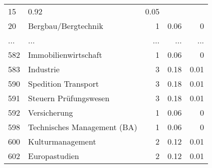 \begin{longtable}{lXrrr}
          \num{15} &
          \num[round-mode=places,round-precision=2]{0.92} &
          \num[round-mode=places,round-precision=2]{0.05} \\
        20 & \multicolumn{1}{X}{Bergbau/Bergtechnik} & %
          \num{1} &
          \num[round-mode=places,round-precision=2]{0.06} &
          \num[round-mode=places,round-precision=2]{0} \\
       ... & ... & ... & ... & ... \\
        582 & \multicolumn{1}{X}{Immobilienwirtschaft} & %
          \num{1} &
          \num[round-mode=places,round-precision=2]{0.06} &
          \num[round-mode=places,round-precision=2]{0} \\

        583 & \multicolumn{1}{X}{Industrie} & %
          \num{3} &
          \num[round-mode=places,round-precision=2]{0.18} &
          \num[round-mode=places,round-precision=2]{0.01} \\

        590 & \multicolumn{1}{X}{Spedition Transport} & %
          \num{3} &
          \num[round-mode=places,round-precision=2]{0.18} &
          \num[round-mode=places,round-precision=2]{0.01} \\

        591 & \multicolumn{1}{X}{Steuern Prüfungswesen} & %
          \num{3} &
          \num[round-mode=places,round-precision=2]{0.18} &
          \num[round-mode=places,round-precision=2]{0.01} \\

        592 & \multicolumn{1}{X}{Versicherung} & %
          \num{1} &
          \num[round-mode=places,round-precision=2]{0.06} &
          \num[round-mode=places,round-precision=2]{0} \\

        598 & \multicolumn{1}{X}{Technisches Management (BA)} & %
          \num{1} &
          \num[round-mode=places,round-precision=2]{0.06} &
          \num[round-mode=places,round-precision=2]{0} \\

        600 & \multicolumn{1}{X}{Kulturmanagement} & %
          \num{2} &
          \num[round-mode=places,round-precision=2]{0.12} &
          \num[round-mode=places,round-precision=2]{0.01} \\

        602 & \multicolumn{1}{X}{Europastudien} & %
          \num{2} &
          \num[round-mode=places,round-precision=2]{0.12} &
          \num[round-mode=places,round-precision=2]{0.01} \\


\end{longtable}
